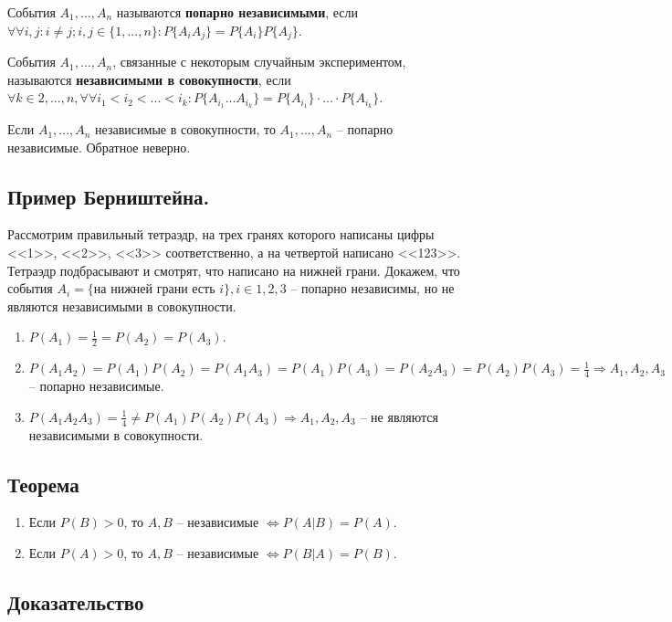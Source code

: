 События $A_1,...,A_n$ называются \textbf{попарно независимыми}, если $\forall\forall i,j: i \neq j; i, j \in \{1, ..., n\}: P\{A_iA_j\} = P\{A_i\}P\{A_j\}$.

События $A_1,...,A_n$, связанные с некоторым случайным экспериментом, называются \textbf{независимыми в совокупности}, если $\forall k \in {2, ..., n}, \forall\forall i_1<i_2<...<i_k: P\{A_{i_1}... A_{i_k}\} = P\{A_{i_1}\} \cdot ... \cdot P\{A_{i_k}\}$.

Если $A_1, ..., A_n$ независимые в совокупности, то $A_1, ..., A_n$ -- попарно независимые. Обратное неверно.

\subsection*{Пример Берништейна.} Рассмотрим правильный тетраэдр, на трех гранях которого написаны цифры <<1>>, <<2>>, <<3>> соответственно, а на четвертой написано <<123>>. Тетраэдр подбрасывают и смотрят, что написано на нижней грани. Докажем, что события $A_i = \{$на нижней грани есть $i\}, i \in {1, 2, 3}$ -- попарно независимы, но не являются независимыми в совокупности.

\begin{enumerate}
	\item $P(A_1) = \frac{1}{2} = P(A_2) = P(A_3)$.
	\item $P(A_1A_2) = P(A_1)P(A_2) = P(A_1A_3) = P(A_1)P(A_3) = P(A_2A_3) = P(A_2)P(A_3) = \frac{1}{4} \Rightarrow A_1, A_2, A_3$ -- попарно независимые.
	\item $P(A_1A_2A_3) = \frac{1}{4} \neq P(A_1)P(A_2)P(A_3) \Rightarrow A_1, A_2, A_3$ -- не являются независимыми в совокупности.
\end{enumerate}

\subsection*{Теорема}

\begin{enumerate}
	\item Если $P(B) > 0$, то $A, B$ -- независимые $\Leftrightarrow P(A|B) = P(A)$.
	\item Если $P(A) > 0$, то $A, B$ -- независимые $\Leftrightarrow P(B|A) = P(B)$.
\end{enumerate}

\subsection*{Доказательство}

